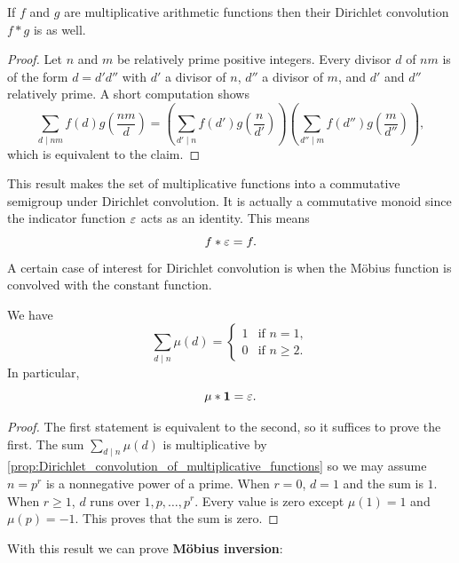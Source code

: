    \begin{proposition}\label{prop:Dirichlet_convolution_of_multiplicative_functions}
      If \(f\) and \(g\) are multiplicative arithmetic functions then their Dirichlet convolution \(f \ast g\) is as well.
    \end{proposition}
    \begin{proof}
      Let \(n\) and \(m\) be relatively prime positive integers. Every divisor \(d\) of \(nm\) is of the form \(d = d'd''\) with \(d'\) a divisor of \(n\), \(d''\) a divisor of \(m\), and \(d'\) and \(d''\) relatively prime. A short computation shows
      \[
        \sum_{d \mid nm}f(d)g\left(\frac{nm}{d}\right) = \left(\sum_{d' \mid n}f(d')g\left(\frac{n}{d'}\right)\right)\left(\sum_{d'' \mid m}f(d'')g\left(\frac{m}{d''}\right)\right),
      \]
      which is equivalent to the claim.
    \end{proof}

    This result makes the set of multiplicative functions into a commutative semigroup under Dirichlet convolution. It is actually a commutative monoid since the indicator function \(\varepsilon\) acts as an identity. This means
    \[
      f \ast \varepsilon = f.
    \]
    A certain case of interest for Dirichlet convolution is when the M\"obius function is convolved with the constant function.

    \begin{proposition}\label{prop:Mobius_indicator}
    We have
    \[
      \sum_{d \mid n}\mu(d) = \begin{cases} 1 & \text{if \(n = 1\)}, \\ 0 & \text{if \(n \ge 2\)}. \end{cases}
    \]
    In particular,
    \[
      \mu \ast \mathbf{1} = \varepsilon.
    \]
    \end{proposition}
    \begin{proof}
      The first statement is equivalent to the second, so it suffices to prove the first. The sum \(\sum_{d \mid n}\mu(d)\) is multiplicative by \cref{prop:Dirichlet_convolution_of_multiplicative_functions} so we may assume \(n = p^{r}\) is a nonnegative power of a prime. When \(r = 0\), \(d = 1\) and the sum is \(1\). When \(r \ge 1\), \(d\) runs over \(1,p,\ldots,p^{r}\). Every value is zero except \(\mu(1) = 1\) and \(\mu(p) = -1\). This proves that the sum is zero.
    \end{proof}

    With this result we can prove \textbf{M\"obius inversion}:

